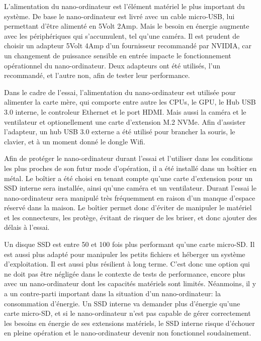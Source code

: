 \par L'alimentation du nano-ordinateur est l'élément matériel le plus important du système. De base le nano-ordinateur est livré avec un cable micro-USB, lui permettant d'être alimenté en 5Volt 2Amp. Mais le besoin en énergie augmente avec les périphériques qui s'accumulent, tel qu'une caméra. Il est prudent de choisir un adapteur 5Volt 4Amp d'un fournisseur recommandé par NVIDIA, car un changement de puissance sensible en entrée impacte le fonctionnement opérationnel du nano-ordinateur. Deux adapteurs ont été utilisés, l'un recommandé, et l'autre non, afin de tester leur performance. 
\par Dans le cadre de l'essai, l'alimentation du nano-ordinateur est utilisée pour alimenter la carte mère, qui comporte entre autre les CPUs, le GPU, le Hub USB 3.0 interne, le controleur Ethernet et le port HDMI. Mais aussi la caméra et  le ventilateur et optionellement une carte d'extension M.2 NVMe. Afin d'assister l'adapteur, un hub USB 3.0 externe a été utilisé pour brancher la souris, le clavier, et à un moment donné le dongle Wifi.
\par [TODO ajout photo] 
\par Afin de protéger le nano-ordinateur durant l'essai et l'utiliser dans les conditions les plus proches de son futur mode d'opération, il a été installé dans un boîtier en métal. Le boîtier a été choisi en tenant compte qu'une carte d'extension pour un SSD interne sera installée, ainsi qu'une caméra et un ventilateur. Durant l'essai le nano-ordinateur sera manipulé très fréquemment en raison d'un manque d'espace réservé dans la maison. Le boîtier permet donc d'éviter de manipuler le matériel et les connecteurs, les protège, évitant de risquer de les briser, et donc ajouter des délais à l'essai. 
\par [TODO ajout photo] 
\par Un disque SSD est entre 50 et 100 fois plus performant qu'une carte micro-SD. Il est aussi plus adapté pour manipuler les petits fichiers et héberger un système d'exploitation. Il est aussi plus résilient à long terme. C'est donc une option qui ne doit pas être négligée dans le contexte de tests de performance, encore plus avec un nano-ordinateur dont les capacités matériels sont limités. Néanmoins, il y a un contre-parti important dans la situation d'un nano-ordinateur: la consommation d'énergie. Un SSD interne va demander plus d'énergie qu'une carte micro-SD, et si le nano-ordinateur n'est pas capable de gérer correctement les besoins en énergie de ses extensions matériels, le SSD interne risque d'échouer en pleine opération et le nano-ordinateur devenir non fonctionnel soudainement.
